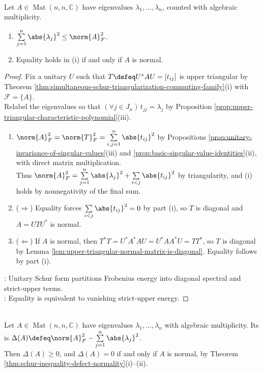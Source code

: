 \begin{theorem} \label{thm:schur-inequality-defect-normality} \\
Let $A\in\operatorname{Mat}(n,n,\mathbb{C})$ have eigenvalues $\lambda_1,\ldots,\lambda_n$, counted with algebraic multiplicity.
\begin{enumerate}[label=(\roman*)]
\setlength{\itemsep}{0pt}
\item $\sum\limits_{j=1}^{n}\abs{\lambda_j}^2\leq\norm{A}_F^2$.
\item Equality holds in (i) if and only if $A$ is normal.
\end{enumerate}
\begin{proof}
Fix a unitary $U$ such that $T\defeq U^*AU=[t_{ij}]$ is upper triangular by Theorem \ref{thm:simultaneous-schur-triangularization-commuting-family}(i) with $\mathcal{F}=\{A\}$.\\
Relabel the eigenvalues so that $(\forall j\in J_n)\,t_{jj}=\lambda_j$ by Proposition \ref{prop:upper-triangular-characteristic-polynomial}(iii).
\begin{enumerate}[label=(\roman*)]
\setlength{\itemsep}{0pt}
\item[$(i)$] $\norm{A}_F^2=\norm{T}_F^2=\sum\limits_{i,j=1}^{n}\abs{t_{ij}}^2$ by Propositions \ref{prop:unitary-invariance-of-singular-values}(iii) and \ref{prop:basic-singular-value-identities}(ii), with direct matrix multiplication.\\
Thus $\norm{A}_F^2=\sum\limits_{j=1}^{n}\abs{\lambda_j}^2+\sum\limits_{i<j}\abs{t_{ij}}^2$ by triangularity, and (i) holds by nonnegativity of the final sum.
\item[$(ii)$] ($\Rightarrow$) Equality forces $\sum\limits_{i<j}\abs{t_{ij}}^2=0$ by part (i), so $T$ is diagonal and $A=UTU^*$ is normal.
\item[$(ii)$] ($\Leftarrow$) If $A$ is normal, then $T^*T=U^*A^*AU=U^*AA^*U=TT^*$, so $T$ is diagonal by Lemma \ref{lem:upper-triangular-normal-matrix-is-diagonal}. Equality follows by part (i).
\end{enumerate}
: Unitary Schur form partitions Frobenius energy into diagonal spectral and strict-upper terms.\\
: Equality is equivalent to vanishing strict-upper energy.
\end{proof}
\end{theorem}

\begin{definition} \label{def:defect-from-normality} \\
Let $A\in\operatorname{Mat}(n,n,\mathbb{C})$ have eigenvalues $\lambda_1,\ldots,\lambda_n$ with algebraic multiplicity. Its  is $\Delta(A)\defeq\norm{A}_F^2-\sum\limits_{j=1}^{n}\abs{\lambda_j}^2$.\\
Then $\Delta(A)\geq0$, and $\Delta(A)=0$ if and only if $A$ is normal, by Theorem \ref{thm:schur-inequality-defect-normality}(i)--(ii).
\end{definition}


